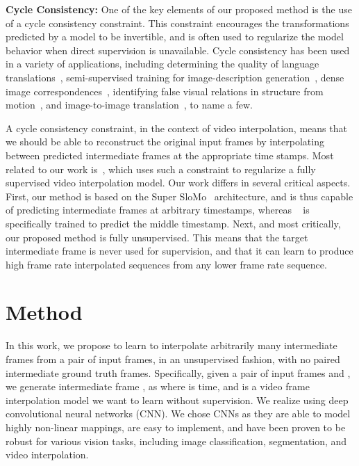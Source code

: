 \documentclass[10pt,twocolumn,letterpaper]{article}
\begin{document}
\noindent\textbf{Cycle Consistency:}
One of the key elements of our proposed method is the use of a cycle consistency constraint. This constraint encourages the transformations predicted by a model to be invertible, and is often used to regularize the model behavior when direct supervision is unavailable. Cycle consistency has been used in a variety of applications, including determining the quality of language translations~\cite{brislin1970back}, semi-supervised training for image-description generation~\cite{mao2016generation}, dense image correspondences~\cite{zhou2016learning}, identifying false visual relations in structure from motion~\cite{zach2010disambiguating}, and image-to-image translation~\cite{zhu2017unpaired}, to name a few.


A cycle consistency constraint, in the context of video interpolation, means that we should be able to reconstruct the original input frames by interpolating between predicted intermediate frames at the appropriate time stamps. Most related to our work is~\cite{liu2019deep}, which uses such a constraint to regularize a fully supervised video interpolation model. Our work differs in several critical aspects. First, our method is based on the Super SloMo~\cite{jiang2018super} architecture, and is thus capable of predicting intermediate frames at arbitrary timestamps, whereas ~\cite{liu2019deep} is specifically trained to predict the middle timestamp. Next, and most critically, our proposed method is fully unsupervised. This means that the target intermediate frame is never used for supervision, and that it can learn to produce high frame rate interpolated sequences from any lower frame rate sequence. 
\section{Method}\label{Methodology}
In this work, we propose to learn to interpolate arbitrarily many intermediate frames from a pair of input frames, in an unsupervised fashion, with no paired intermediate ground truth frames. Specifically, given a pair of input frames  and , we generate intermediate frame , as  
where  is time, and  is a video frame interpolation model we want to learn without supervision. We realize  using deep convolutional neural networks (CNN). We chose CNNs as they are able to model highly non-linear mappings, are easy to implement, and have been proven to be robust for various vision tasks, including image classification, segmentation, and video interpolation.
\end{document}

